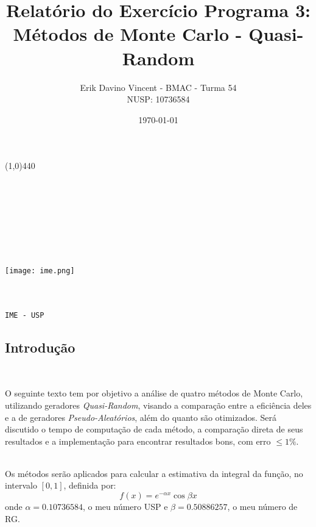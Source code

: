 \documentclass[pt12]{article}
\begin{document}
\begin{titlepage}

\title{\textbf{Relatório do Exercício Programa 3:\\Métodos de Monte Carlo - Quasi-Random}}
\author{Erik Davino Vincent - BMAC - Turma 54 \\ NUSP: 10736584}
\date{\today}
\maketitle
\line(1,0){440}
\ \\
\ \\
\ \\
\ \\
\ \\
\ \\
\ \\
\ \\
\begin{center}

\texttt{[image: ime.png]}\\
\ \\
\ \\
\begin{LARGE}\tt{IME - USP} \end{LARGE}


\end{center}

\end{titlepage}

\tableofcontents

\newpage

\begin{center}\section{Introdução}\end{center}
\

O seguinte texto tem por objetivo a análise de quatro métodos de Monte Carlo, utilizando geradores \textit{Quasi-Random}, visando a comparação entre a eficiência deles e a de geradores \textit{Pseudo-Aleatórios}, além do quanto são otimizados. Será discutido o tempo de computação de cada método, a comparação direta de seus resultados e a implementação para encontrar resultados bons, com erro $\leq1\% $.\\
\ 

Os métodos serão aplicados para calcular a estimativa da integral da função, no intervalo $ [0,1]$, definida por:
$$f(x) = e^{-\alpha x}\cos{\beta x} $$
onde $\alpha = 0.10736584$, o meu número USP e $\beta = 0.50886257$, o meu número de RG.\\
\end{document}
